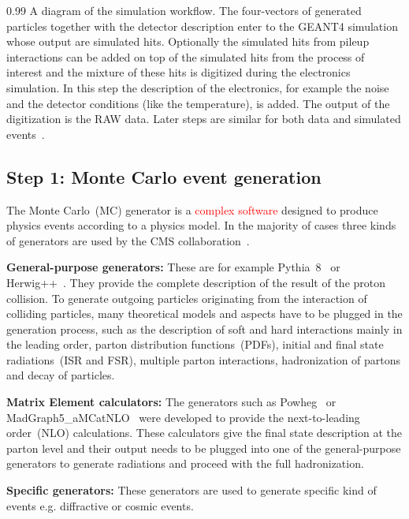                  {0.99}       %
                 { A diagram of the simulation workflow. The four-vectors of generated particles together with the detector description enter to the GEANT4 simulation whose output are simulated hits. Optionally the simulated hits from pileup interactions can be added on top of the simulated hits from the process of interest and the mixture of these hits is digitized during the electronics simulation. In this step the description of the electronics, for example the noise and the detector conditions (like the temperature), is added. The output of the digitization is the RAW data. Later steps are similar for both data and simulated events~\cite{website:simuBasics}. }


\subsection{Step 1: Monte Carlo event generation}

The Monte Carlo~(MC) generator is a \textcolor{red}{complex software} designed to produce physics events according to a physics model. In the majority of cases three kinds of generators are used by the CMS collaboration~\cite{website:generation, website:generationIntro}. 

\textbf{General-purpose generators: }
These are for example Pythia~8~\cite{Sjostrand:2014zea} or Herwig++~\cite{Bahr:2008pv}. They provide the complete description of the result of the proton collision. To generate outgoing particles originating from the interaction of colliding particles, many theoretical models and aspects have to be plugged in the generation process, such as the description of soft and hard interactions mainly in the leading order, parton distribution functions~(PDFs), initial and final state radiations~(ISR and FSR), multiple parton interactions, hadronization of partons and decay of particles.

\textbf{Matrix Element calculators: }
The generators such as Powheg~\cite{Oleari:2010nx} or MadGraph5\_aMCatNLO~\cite{Alwall:2014hca} were developed to provide the next-to-leading order~(NLO) calculations. These calculators give the final state description at the parton level and their output needs to be plugged into one of the general-purpose generators to generate radiations and proceed with the full hadronization.

\textbf{Specific generators: }
These generators are used to generate specific kind of events e.g. diffractive or cosmic events.

